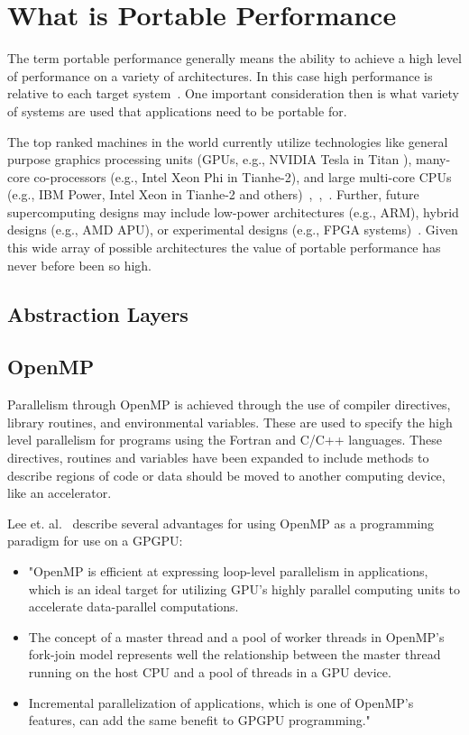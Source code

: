 \section{\textbf{What is Portable Performance}}

The term portable performance generally means the ability to achieve a high level of performance on a variety of architectures.
%
In this case high performance is relative to each target system~\cite{michaelwolfe2016}.
%
One important consideration then is what variety of systems are used that applications need to be portable for. 
%

%
The top ranked machines in the world currently utilize technologies like general purpose graphics processing units (GPUs, e.g., NVIDIA Tesla in Titan ), many-core co-processors (e.g., Intel Xeon Phi in Tianhe-2), and large multi-core CPUs (e.g., IBM Power, Intel Xeon in Tianhe-2 and others)~\cite{michaelwolfe2016},~\cite{top500thelist2016},~\cite{hankchilds2015}. 
%
Further, future supercomputing designs may include low-power architectures (e.g., ARM), hybrid designs (e.g., AMD APU), or experimental designs (e.g., FPGA systems)~\cite{hankchilds2015}. 
%
Given this wide array of possible architectures the value of portable performance has never before been so high.
%

\subsection{ \textbf{Abstraction Layers}}


\subsection*{\textbf{OpenMP}}

Parallelism through OpenMP is achieved through the use of compiler directives, library routines, and environmental variables.
%
These are used to specify the high level parallelism for programs using the Fortran and C/C++ languages.
%
These directives, routines and variables have been expanded to include methods to describe regions of code or data should be moved to another computing device, like an accelerator.~\cite{openmp}

Lee et. al.~\cite{lee2009openmp} describe several advantages for using OpenMP as a programming paradigm for use on a GPGPU:
\begin{itemize}
\item "OpenMP is efficient at expressing loop-level parallelism in applications, which is an ideal target for utilizing GPU's highly parallel computing units to accelerate data-parallel computations.
\item The concept of a master thread and a pool of worker threads in OpenMP's fork-join model represents well the relationship between the master thread running on the host CPU and a pool of threads in a GPU device.
\item Incremental parallelization of applications, which is one of OpenMP's features, can add the same benefit to GPGPU programming."
\end{itemize}~\cite{lee2009openmp}

